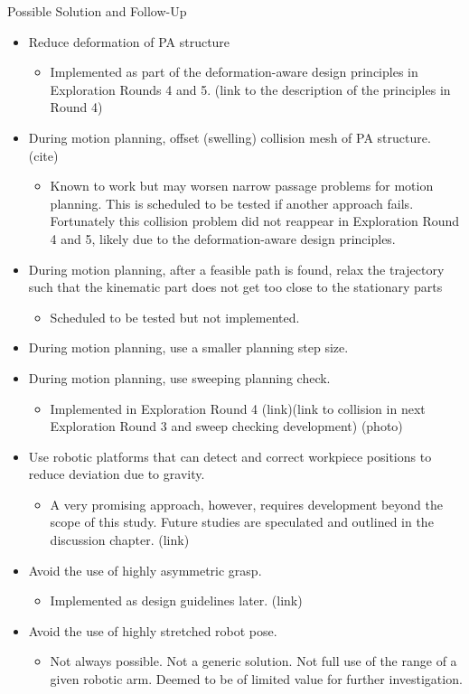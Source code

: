 Possible Solution and Follow-Up
\begin{itemize}
    \item Reduce deformation of PA structure
    \begin{itemize}
        \item Implemented as part of the deformation-aware design principles in Exploration Rounds 4 and 5. (link to the description of the principles in Round 4)
    \end{itemize}
    \item During motion planning, offset (swelling) collision mesh of PA structure. (cite)
    \begin{itemize}
        \item Known to work but may worsen narrow passage problems for motion planning. This is scheduled to be tested if another approach fails. Fortunately this collision problem did not reappear in Exploration Round 4 and 5, likely due to the deformation-aware design principles.
    \end{itemize}
    \item During motion planning, after a feasible path is found, relax the trajectory such that the kinematic part does not get too close to the stationary parts
    \begin{itemize}
        \item Scheduled to be tested but not implemented.
    \end{itemize}
    \item During motion planning, use a smaller planning step size.
    \item During motion planning, use sweeping planning check.
    \begin{itemize}
        \item Implemented in Exploration Round 4 (link)(link to collision in next Exploration Round 3 and sweep checking development) (photo)
    \end{itemize}
    \item Use robotic platforms that can detect and correct workpiece positions to reduce deviation due to gravity.
    \begin{itemize}
        \item A very promising approach, however, requires development beyond the scope of this study. Future studies are speculated and outlined in the discussion chapter. (link)
    \end{itemize}
    \item Avoid the use of highly asymmetric grasp. 
    \begin{itemize}
        \item Implemented as design guidelines later. (link)
    \end{itemize}
    \item Avoid the use of highly stretched robot pose. 
    \begin{itemize}
        \item Not always possible. Not a generic solution. Not full use of the range of a given robotic arm. Deemed to be of limited value for further investigation.
    \end{itemize}
\end{itemize}

